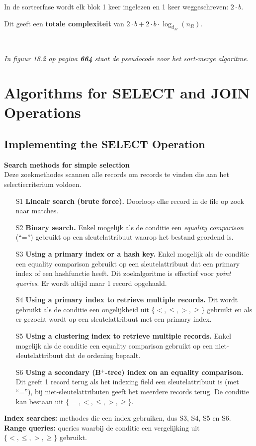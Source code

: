 In de sorteerfase wordt elk blok 1 keer ingelezen en 1 keer weggeschreven: $2 \cdot b$.

Dit geeft een \textbf{totale complexiteit} van $2 \cdot b + 2 \cdot b \cdot \log_{d_M}(n_R)$.

~

\noindent \textit{In figuur 18.2 op pagina \textbf{664} staat de pseudocode voor het sort-merge algoritme.}



\section{Algorithms for SELECT and JOIN Operations}
\subsection{Implementing the SELECT Operation}
\textbf{Search methods for simple selection}\\
Deze zoekmethodes scannen alle records om records te vinden die aan het selectiecriterium voldoen.
\begin{enumerate}
	\item[S1] \textbf{Lineair search (brute force).} Doorloop elke record in de file op zoek naar matches.
	
	\item[S2] \textbf{Binary search.} Enkel mogelijk als de conditie een \textit{equality comparison} (``='') gebruikt op een sleutelattribuut waarop het bestand geordend is.
	
	\item[S3] \textbf{Using a primary index or a hash key.} Enkel mogelijk als de conditie een equality comparison gebruikt op een sleutelattribuut dat een primary index of een hashfunctie heeft. Dit zoekalgoritme is effectief voor \textit{point queries}. Er wordt altijd maar 1 record opgehaald.
	
	\item[S4] \textbf{Using a primary index to retrieve multiple records.} Dit wordt gebruikt als de conditie een ongelijkheid uit $\{<,\leqslant,>,\geqslant\}$ gebruikt en als er gezocht wordt op een sleutelattribuut met een primary index.
	
	\item[S5] \textbf{Using a clustering index to retrieve multiple records.} Enkel mogelijk als de conditie een equality comparison gebruikt op een niet-sleutelattribuut dat de ordening bepaalt.
	
	\item[S6] \textbf{Using a secondary (B$^+$-tree) index on an equality comparison.} Dit geeft 1 record terug als het indexing field een sleutelattribuut is (met ``=''), bij niet-sleutelattributen geeft het meerdere records terug. De conditie kan bestaan uit $\{=,<,\leqslant,>,\geqslant\}$.
\end{enumerate}
\textbf{Index searches:} methodes die een index gebruiken, dus S3, S4, S5 en S6.\\
\textbf{Range queries:} queries waarbij de conditie een vergelijking uit $\{<,\leqslant,>,\geqslant\}$ gebruikt.

